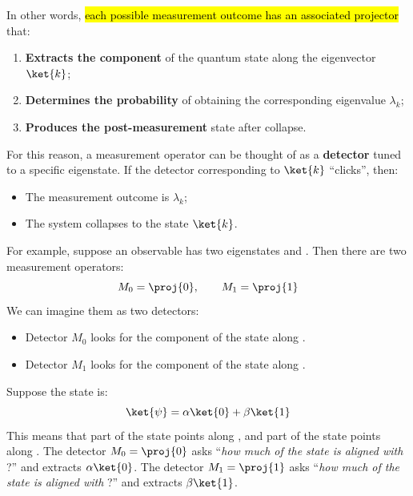 \noindent
In other words, \hl{each possible measurement outcome has an associated projector} that:
\begin{enumerate}
    \item \textbf{Extracts the component} of the quantum state along the eigenvector $\ket{k}$;
    \item \textbf{Determines the probability} of obtaining the corresponding eigenvalue $\lambda_k$;
    \item \textbf{Produces the post-measurement} state after collapse.
\end{enumerate}
For this reason, a measurement operator can be thought of as a \textbf{detector} tuned to a specific eigenstate. If the detector corresponding to $\ket{k}$ ``clicks'', then:
\begin{itemize}
    \item The measurement outcome is $\lambda_k$;
    \item The system collapses to the state $\ket{k}$.
\end{itemize}
For example, suppose an observable has two eigenstates  and . Then there are two measurement operators:
\begin{equation*}
    M_0 = \proj{0},
    \qquad
    M_1 = \proj{1}
\end{equation*}
We can imagine them as two detectors:
\begin{itemize}
    \item Detector $M_0$ looks for the component of the state along .
    \item Detector $M_1$ looks for the component of the state along .
\end{itemize}
Suppose the state is:
\begin{equation*}
    \ket{\psi} = \alpha\ket{0} + \beta\ket{1}
\end{equation*}
This means that part of the state points along , and part of the state points along . The detector $M_0 = \proj{0}$ asks ``\emph{how much of the state is aligned with }?'' and extracts $\alpha\ket{0}$. The detector $M_1 = \proj{1}$ asks ``\emph{how much of the state is aligned with }?'' and extracts $\beta\ket{1}$.

